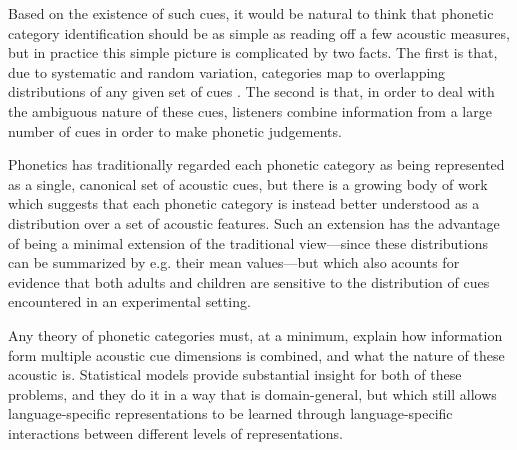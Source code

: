 \documentclass[12pt]{article}
\begin{document}
Based on the existence of such cues, it would be natural to think that phonetic category identification should be as simple as reading off a few acoustic measures, but in practice this simple picture is complicated by two facts.  The first is that, due to systematic and random variation, categories map to overlapping distributions of any given set of cues \cite{Hillenbrand1995}.  The second is that, in order to deal with the ambiguous nature of these cues, listeners combine information from a large number of cues in order to make phonetic judgements.

Phonetics has traditionally regarded each phonetic category as being represented as a single, canonical set of acoustic cues, but there is a growing body of work which suggests that each phonetic category is instead better understood as a distribution over a set of acoustic features.  Such an extension has the advantage of being a minimal extension of the traditional view---since these distributions can be summarized by e.g. their mean values---but which also acounts for evidence that both adults and children are sensitive to the distribution of cues encountered in an experimental setting.  


Any theory of phonetic categories must, at a minimum, explain how information form multiple acoustic cue dimensions is combined, and what the nature of these acoustic is.  Statistical models provide substantial insight for both of these problems, and they do it in a way that is domain-general, but which still allows language-specific representations to be learned through language-specific interactions between different levels of representations.  
\end{document}
